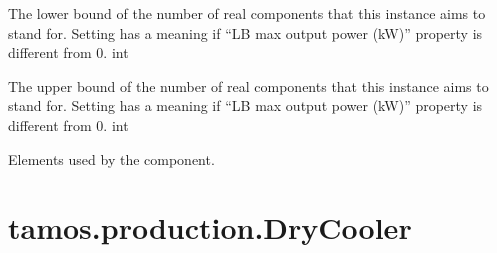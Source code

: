 \documentclass[letterpaper,10pt,english]{sphinxmanual}
\begin{document}
\begin{fulllineitems}
\begin{fulllineitems}
\label{\detokenize{generated/tamos.production.CompHP:tamos.production.CompHP.units_number_lb}}
\pysigstartsignatures
{}
\pysigstopsignatures
\sphinxAtStartPar
The lower bound of the number of real components that this instance aims to stand for.
Setting  has a meaning if “LB max output power (kW)” property is different from 0.
int

\end{fulllineitems}


\begin{fulllineitems}
\label{\detokenize{generated/tamos.production.CompHP:tamos.production.CompHP.units_number_ub}}
\pysigstartsignatures
{}
\pysigstopsignatures
\sphinxAtStartPar
The upper bound of the number of real components that this instance aims to stand for.
Setting  has a meaning if “LB max output power (kW)” property is different from 0.
int

\end{fulllineitems}


\begin{fulllineitems}
\label{\detokenize{generated/tamos.production.CompHP:tamos.production.CompHP.used_elements}}
\pysigstartsignatures
{}
\pysigstopsignatures
\sphinxAtStartPar
Elements used by the component.

\end{fulllineitems}


\end{fulllineitems}


\sphinxstepscope


\section{tamos.production.DryCooler}
\label{\detokenize{generated/tamos.production.DryCooler:tamos-production-drycooler}}\label{\detokenize{generated/tamos.production.DryCooler::doc}}
\end{document}
